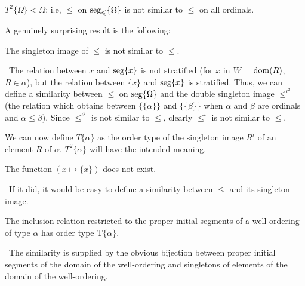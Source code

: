 \begin{thm}
 $T^2\{\Omega\} < \Omega$; i.e, $\leq$ on
 $\seg_{\leq}\{\Omega\}\index{segment}$
 is not similar to $\leq$ on all\linebreak
 ordinals.
\end{thm}

A genuinely surprising result is the following:

\begin{thm}
 The singleton image of $\leq$ is not similar to $\leq$.
\end{thm}

\preuve\ The relation between $x$ and $\mathop{\mathrm{seg}}\{x\}$ is not
stratified (for $x$ in $W = \mathop{\mathrm{dom}}(R)$, $R \in \alpha$),
but the relation between $\{{x}\}$ and $\mathop{\mathrm{seg}}\{x\}$ is
stratified.  Thus, we can define a similarity between $\leq$
on $\mathop{\mathrm{seg}}\{\Omega\}$ and the double singleton image
$\leq^{\iota^2}$ (the relation which obtains between $\{\{\alpha\}\}$ and
$\{\{\beta\}\}$ when $\alpha$ and $\beta$ are ordinals
and $\alpha \leq \beta$).  Since $\leq^{\iota^2}$ is not similar to $\leq$,
clearly $\leq^{\iota}$ is not similar to $\leq$.
\finpreuve

\begin{definition}
 We can now define $T\{\alpha\}$ as the order
 type of the singleton 
 image $R^{\iota}$ of an element $R$ of $\alpha$.  $T^2\{\alpha\}$ will have the
 intended meaning.  
\end{definition}

\begin{thm}
 The function $(x \mapsto  \{x\})$ does not exist.
\end{thm}

\preuve\ If it did, it would be easy to define a similarity
between $\leq$ and its singleton image.
\finpreuve

\begin{thm}
 The inclusion relation restricted to the proper
 initial segments of a well-ordering of
 type $\alpha$ has order type
 T$\{\alpha\}$.
\end{thm}

\preuve\ The similarity is supplied by the obvious bijection
between proper initial segments of the domain of the
well-ordering and singletons of elements of the domain of the
well-ordering.
\finpreuve


